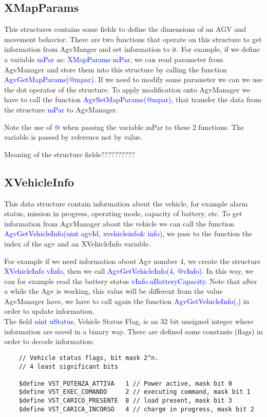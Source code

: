 \subsection{XMapParams}
This structures contains some fields to define the dimensions of an AGV and movement behavior. There are two functions that operate on this structure to get information from AgvManger and set information to it.
For example, if we define a variable \textcolor{blue}{mPar} as: \textcolor{blue}{XMapParams mPar}, we can read parameter from AgvManager and store them into this structure by calling the function \textcolor{blue}{AgvGetMapParams(@mpar)}.
If we need to modify some parameter we can we use the dot operator of the structure.
To apply modification onto AgvManager we have to call the function \textcolor{blue}{AgvSetMapParams(@mpar)}, that transfer the data from the structure \textcolor{blue}{mPar} to AgvManager.

Note the use of \textcolor{blue}{@} when passing the variable mPar to these 2 functions. The variable is passed by reference not by value.

Meaning of the structure fields??????????

\subsection{XVehicleInfo}
This data structure contain information about the vehicle, for example alarm status, mission in progress, operating mode, capacity of battery, etc.
To get information from AgvManager about the vehicle we can call the function \textcolor{blue}{AgvGetVehicleInfo(uint agvId, xvehicleinfo\& info)}, we pass to the function the index of the agv and an XVehicleInfo variable.

For example if we need information about Agv number 4, we create the structure \textcolor{blue}{XVehicleInfo vInfo}, then we call \textcolor{blue}{AgvGetVehicleInfo(4, @vInfo)}.
In this way, we can for example read the battery status \textcolor{blue}{vInfo.uBatteryCapacity}. Note that after a while the Agv is working, this value will be different from the value AgvManager have, we have to call again the function \textcolor{blue}{AgvGetVehicleInfo(,)} in order to update information.\\

The field \textcolor{blue}{uint uStatus}, Vehicle Status Flag,  is an 32 bit unsigned integer where information are saved in a binary way. There are defined some constants (flags) in order to decode information:
\begin{lstlisting}
	// Vehicle status flags, bit mask 2^n.
	// 4 least significant bits
	
	$define VST_POTENZA_ATTIVA   1 // Power active, mask bit 0
	$define VST_EXEC_COMANDO     2 // executing command, mask bit 1
	$define VST_CARICO_PRESENTE  8 // load present, mask bit 3
	$define VST_CARICA_INCORSO   4 // charge in progress, mask bit 2
\end{lstlisting}

